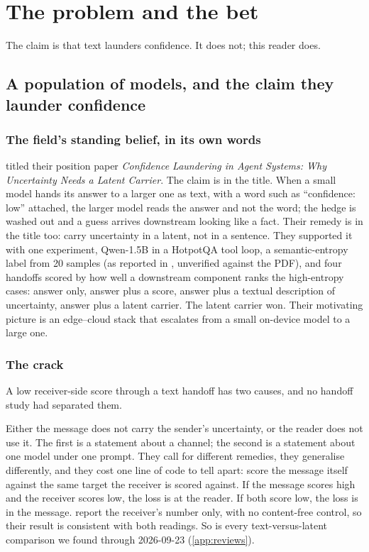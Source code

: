 \documentclass[11pt,a4paper]{report}
\begin{document}
\part{The problem and the bet}
\label{part:problem}

\noindent The claim is that text launders confidence. It does not; this reader does.

\chapter{A population of models, and the claim they launder confidence}
\label{ch:population}

\section{The field's standing belief, in its own words}

\citet{2606.20662} titled their position paper \emph{Confidence Laundering in Agent Systems: Why Uncertainty Needs a Latent Carrier}. The claim is in the title. When a small model hands its answer to a larger one as text, with a word such as ``confidence: low'' attached, the larger model reads the answer and not the word; the hedge is washed out and a guess arrives downstream looking like a fact. Their remedy is in the title too: carry uncertainty in a latent, not in a sentence. They supported it with one experiment, Qwen-1.5B in a HotpotQA tool loop, a semantic-entropy label from 20 samples (as reported in , unverified against the PDF), and four handoffs scored by how well a downstream component ranks the high-entropy cases: answer only, answer plus a score, answer plus a textual description of uncertainty, answer plus a latent carrier. The latent carrier won. Their motivating picture is an edge--cloud stack that escalates from a small on-device model to a large one.

\section{The crack}

A low receiver-side score through a text handoff has two causes, and no handoff study had separated them.

Either the message does not carry the sender's uncertainty, or the reader does not use it. The first is a statement about a channel; the second is a statement about one model under one prompt. They call for different remedies, they generalise differently, and they cost one line of code to tell apart: score the message itself against the same target the receiver is scored against. If the message scores high and the receiver scores low, the loss is at the reader. If both score low, the loss is in the message. \citet{2606.20662} report the receiver's number only, with no content-free control, so their result is consistent with both readings. So is every text-versus-latent comparison we found through 2026-09-23 (\cref{app:reviews}).
\end{document}
